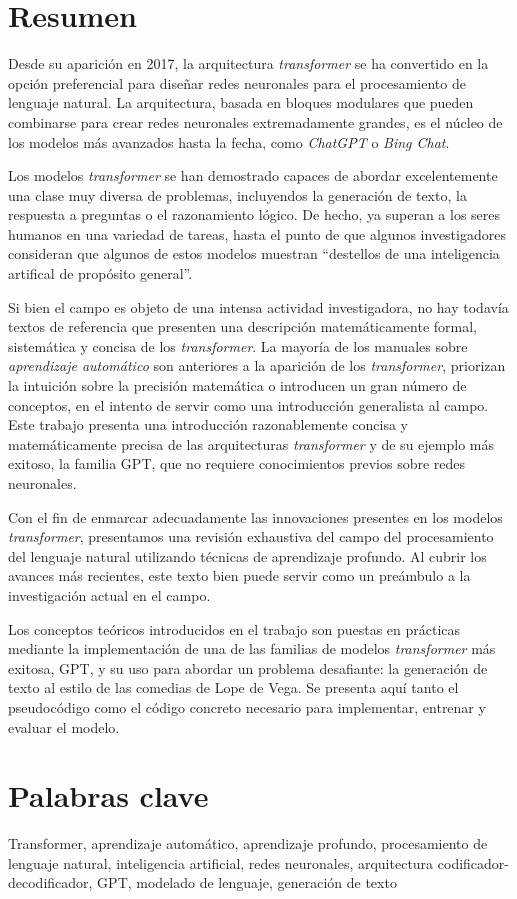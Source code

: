 \section*{Resumen}
Desde su aparición en 2017, la arquitectura \textit{transformer} se ha convertido en la opción preferencial para diseñar redes neuronales para el procesamiento de lenguaje natural. La arquitectura, basada en bloques modulares que pueden combinarse para crear redes neuronales extremadamente grandes, es el núcleo de los modelos más avanzados hasta la fecha, como \textit{ChatGPT} o \textit{Bing Chat}.

Los modelos \textit{transformer} se han demostrado capaces de abordar excelentemente una clase muy diversa de problemas, incluyendos la generación de texto, la respuesta a preguntas o el razonamiento lógico. De hecho, ya superan a los seres humanos en una variedad de tareas, hasta el punto de que algunos investigadores consideran que algunos de estos modelos muestran ``destellos de una inteligencia artifical de propósito general''\cite{bubeck2023sparks}.

Si bien el campo es objeto de una intensa actividad investigadora, no hay todavía textos de referencia que presenten una descripción matemáticamente formal, sistemática y concisa de los \textit{transformer}. La mayoría de los manuales sobre \textit{aprendizaje automático} son anteriores a la aparición de los \textit{transformer}, priorizan la intuición sobre la precisión matemática o introducen un gran número de conceptos, en el intento de servir como una introducción generalista al campo. Este trabajo presenta una introducción razonablemente concisa y matemáticamente precisa de las arquitecturas \textit{transformer} y de su ejemplo más exitoso, la familia GPT, que no requiere conocimientos previos sobre redes neuronales. 

Con el fin de enmarcar adecuadamente las innovaciones presentes en los modelos \textit{transformer}, presentamos una revisión exhaustiva del campo del procesamiento del lenguaje natural utilizando técnicas de aprendizaje profundo. Al cubrir los avances más recientes, este texto bien puede servir como un preámbulo a la investigación actual en el campo.

Los conceptos teóricos introducidos en el trabajo son puestas en prácticas mediante la implementación de una de las familias de modelos \textit{transformer} más exitosa, GPT, y su uso para abordar un problema desafiante: la generación de texto al estilo de las comedias de Lope de Vega. Se presenta aquí tanto el pseudocódigo como el código concreto necesario para implementar, entrenar y evaluar el modelo.

\section*{Palabras clave}
Transformer, aprendizaje automático, aprendizaje profundo, procesamiento de lenguaje natural, inteligencia artificial, redes neuronales, arquitectura codificador-decodificador, GPT, modelado de lenguaje, generación de texto  

